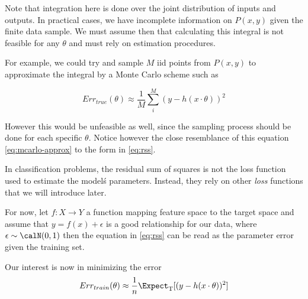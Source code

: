 Note that integration here is done over the joint distribution of inputs and outputs. In practical cases, we have incomplete information on $P(x,y)$ given the finite data sample.
We must assume then that calculating this integral is not feasible for any $\theta$ and must rely on estimation procedures.

For example, we could try and sample $M$ iid points from $P(x,y)$ to approximate the integral by a Monte Carlo scheme such as 

\begin{equation} \label{eq:mcarlo-approx}
    Err_{true}(\theta)  \approx \frac{1}{M} \sum_i^M ( y - h(x \cdot \theta) )^2
\end{equation}

However this would be unfeasible as well, since the sampling process should be done for each specific $\theta$. Notice however the close resemblance of this equation \ref{eq:mcarlo-approx} to the form in \ref{eq:rss}. 

In classification problems, the residual sum of squares is not the loss function used to estimate the model\'s parameters. Instead, they rely on other \textit{loss} functions that we will introduce later.

For now, let $f: X \rightarrow Y$ a function mapping feature space to the target space and assume that $y  =  f(x)  +  \epsilon $ is a good relationship for our data, where $\epsilon \sim \calN(0,1) $ then the equation in \ref{eq:rss} can be read as the parameter error given the training set.

Our interest is now in minimizing the error
\[
Err_{train}(\theta) \approx \frac{1}{n} \Expect_{ \mathrm{T}}[(y - h(x \cdot \theta) )^2]
\]


